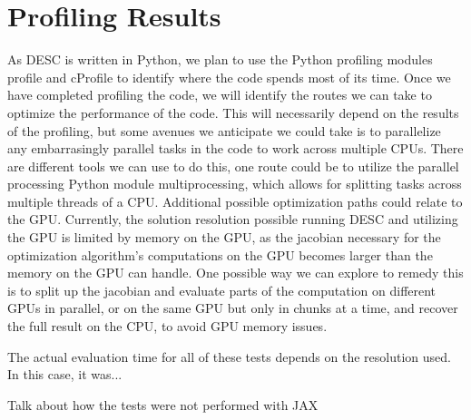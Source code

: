 \documentclass{article}
\begin{document}
\section{Profiling Results}


As DESC is written in Python, we plan to use the Python profiling modules profile and cProfile to identify where the code spends most of its time. Once we have completed profiling the code, we will identify the routes we can take to optimize the performance of the code. This will necessarily depend on the results of the profiling, but some avenues we anticipate we could take is to parallelize any embarrasingly parallel tasks in the code to work across multiple CPUs. There are different tools we can use to do this, one route could be to utilize the parallel processing Python module multiprocessing, which allows for splitting tasks across multiple threads of a CPU. Additional possible optimization paths could relate to the GPU. Currently, the solution resolution possible running DESC and utilizing the GPU is limited by memory on the GPU, as the jacobian necessary for the optimization algorithm's computations on the GPU becomes larger than the memory on the GPU can handle. One possible way we can explore to remedy this is to split up the jacobian and evaluate parts of the computation on different GPUs in parallel, or on the same GPU but only in chunks at a time, and recover the full result on the CPU, to avoid GPU memory issues.


The actual evaluation time for all of these tests depends on the resolution used.  In this case, it was...

Talk about how the tests were not performed with JAX
\end{document}

